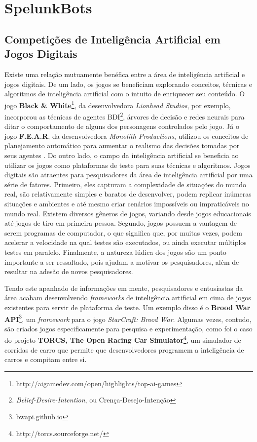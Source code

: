 \chapter{\label{chap:spelunkbots}SpelunkBots}

\section{\label{section:game-ai-competitions}Competições de Inteligência
Artificial em Jogos Digitais}
Existe uma relação mutuamente benéfica entre a área de inteligência artificial e
jogos digitais.  De um lado, os jogos se beneficiam explorando conceitos,
técnicas e algoritmos de inteligência artificial com o intuito de enriquecer seu
conteúdo. O jogo \textbf{Black \&
White}\footnote{http://aigamedev.com/open/highlights/top-ai-games}, da
desenvolvedora \textit{Lionhead Studios}, por exemplo, incorporou as técnicas de
agentes BDI\footnote{\textit{Belief-Desire-Intention}, ou
Crença-Desejo-Intenção}, árvores de decisão e redes neurais para ditar o
comportamento de alguns dos personagens controlados pelo jogo.  Já o jogo
\textbf{F.E.A.R}, da desenvolvedora \textit{Monolith Productions}, utilizou os
conceitos de planejamento automático para aumentar o realismo das decisões
tomadas por seus agentes \cite{FEARPLANNING}.  Do outro lado, o campo da
inteligência artificial se beneficia ao utilizar os jogos como plataformas de
teste para suas técnicas e algoritmos. Jogos digitais são atraentes para
pesquisadores da área de inteligência artificial por uma série de fatores.
Primeiro, eles capturam a complexidade de situações do mundo real, são
relativamente simples e baratos de desenvolver, podem replicar inúmeras
situações e ambientes e até mesmo criar cenários impossíveis ou impraticáveis no
mundo real. Existem diversos gêneros de jogos, variando desde jogos educacionais
até jogos de tiro em primeira pessoa.  Segundo, jogos possuem a vantagem de
serem programas de computador, o que significa que, por muitas vezes, podem
acelerar a velocidade na qual testes são executados, ou ainda executar múltiplos
testes em paralelo. Finalmente, a natureza lúdica dos jogos são um ponto
importante a ser ressaltado, pois ajudam a motivar os pesquisadores, além de
resultar na adesão de novos pesquisadores.

Tendo este apanhado de informações em mente, pesquisadores e entusiastas da área
acabam desenvolvendo \textit{frameworks} de inteligência artificial em cima de
jogos existentes para servir de plataforma de teste. Um exemplo disso é o
\textbf{Brood War API}\footnote{bwapi.github.io}, um \textit{framework} para o
jogo \textit{StarCraft: Brood War}. Algumas vezes, contudo, são criados jogos
especificamente para pesquisa e experimentação, como foi o caso do projeto
\textbf{TORCS, The Open Racing Car
Simulator}\footnote{http://torcs.sourceforge.net/}, um simulador de corridas de
carro que permite que desenvolvedores programem a inteligência de carros e
compitam entre si.


